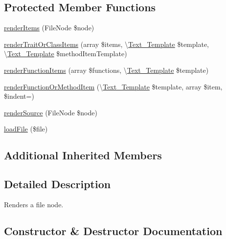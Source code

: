 \subsection*{Protected Member Functions}
\begin{DoxyCompactItemize}
\item 
\mbox{\hyperlink{class_sebastian_bergmann_1_1_code_coverage_1_1_report_1_1_html_1_1_file_aecb959c80ae928438a08cc4bb8b09523}{render\+Items}} (File\+Node \$node)
\item 
\mbox{\hyperlink{class_sebastian_bergmann_1_1_code_coverage_1_1_report_1_1_html_1_1_file_a39d9cec9fcee933881243ac5bcaa871a}{render\+Trait\+Or\+Class\+Items}} (array \$items, \textbackslash{}\mbox{\hyperlink{class_text___template}{Text\+\_\+\+Template}} \$template, \textbackslash{}\mbox{\hyperlink{class_text___template}{Text\+\_\+\+Template}} \$method\+Item\+Template)
\item 
\mbox{\hyperlink{class_sebastian_bergmann_1_1_code_coverage_1_1_report_1_1_html_1_1_file_aca2b8d7ea4549f5b871f1c5e71b8e025}{render\+Function\+Items}} (array \$functions, \textbackslash{}\mbox{\hyperlink{class_text___template}{Text\+\_\+\+Template}} \$template)
\item 
\mbox{\hyperlink{class_sebastian_bergmann_1_1_code_coverage_1_1_report_1_1_html_1_1_file_a771f63bb534d7903b9a7983280970855}{render\+Function\+Or\+Method\+Item}} (\textbackslash{}\mbox{\hyperlink{class_text___template}{Text\+\_\+\+Template}} \$template, array \$item, \$indent=\textquotesingle{}\textquotesingle{})
\item 
\mbox{\hyperlink{class_sebastian_bergmann_1_1_code_coverage_1_1_report_1_1_html_1_1_file_a20e08d0932a76b8ea2d92761eff28b73}{render\+Source}} (File\+Node \$node)
\item 
\mbox{\hyperlink{class_sebastian_bergmann_1_1_code_coverage_1_1_report_1_1_html_1_1_file_aeaa8fe9940f4e60af3da76513b134d0f}{load\+File}} (\$file)
\end{DoxyCompactItemize}
\subsection*{Additional Inherited Members}


\subsection{Detailed Description}
Renders a file node. 

\subsection{Constructor \& Destructor Documentation}
\mbox{\label{class_sebastian_bergmann_1_1_code_coverage_1_1_report_1_1_html_1_1_file_a51e93af278248ccd1d16725b156b0a36}} 
